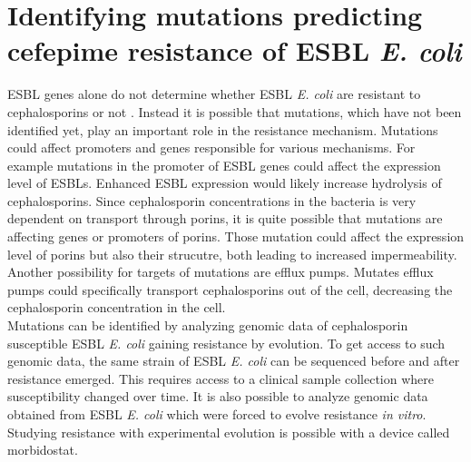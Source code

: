 \section{Identifying mutations predicting cefepime resistance of ESBL \textit{E. coli}}
ESBL genes alone do not determine whether ESBL \textit{E. coli} are resistant to cephalosporins or not \cite{hombach_consequences_2013}. Instead it is possible that mutations, which have not been identified yet, play an important role in the resistance mechanism. Mutations could affect promoters and genes responsible for various mechanisms. For example mutations in the promoter of ESBL genes could affect the expression level of ESBLs. Enhanced ESBL expression would likely increase hydrolysis of cephalosporins. Since cephalosporin concentrations in the bacteria is very dependent on transport through porins, it is quite possible that mutations are affecting genes or promoters of porins. Those mutation could affect the expression level of porins but also their strucutre, both leading to increased impermeability. Another possibility for targets of mutations are efflux pumps. Mutates efflux pumps could specifically transport cephalosporins out of the cell, decreasing the cephalosporin concentration in the cell. \\
Mutations can be identified by analyzing genomic data of cephalosporin susceptible ESBL \textit{E. coli} gaining resistance by evolution. To get access to such genomic data, the same strain of ESBL \textit{E. coli} can be sequenced before and after resistance emerged. This requires access to a clinical sample collection where susceptibility changed over time. It is also possible to analyze genomic data obtained from ESBL \textit{E. coli} which were forced to evolve resistance \textit{in vitro}. Studying resistance with experimental evolution is possible with a device called morbidostat.

